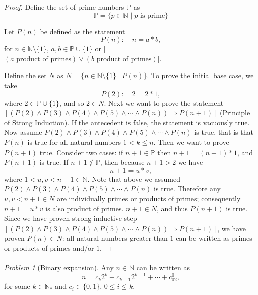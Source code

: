 \documentclass[11pt,twoside, reqno, align]{amsart}
\theoremstyle{remark}
\newtheorem{Prob}{Problem}
\def\N{\mathbb N}
\def\P{\mathbb P}
\newcommand{\OR}{\vee}
\newcommand{\AND}{\wedge}
\renewcommand{\implies}{\Rightarrow}
\begin{document}
\begin{proof}

Define the set of prime numbers $\P$ as
$$
\P = \{p \in \N \mid p \text{ is prime}\}
$$

Let $P(n)$ be defined as the statement
$$
P(n): \quad n = a*b,
$$
for $n \in \N \setminus \{1\}$, $a,b \in \P \cup \{1\}$ or [$(a\text{ product of primes}) \OR (b\text{ product of primes})$]. 

Define the set $N$ as $N = \{ n \in \N \setminus \{1\} \mid P(n)\}$. To prove the initial base case, we take
$$
P(2): \quad 2 = 2*1,
$$
where $2 \in \P \cup \{1\}$, and so $2 \in N$. Next we want to prove the statement $[(P(2) \AND P(3) \AND P(4) \AND P(5) \AND \cdots \AND P(n)) \implies P(n+1)]$ (Principle of Strong Induction). If the antecedent is false, the statement is vacuously true. Now assume $P(2) \AND P(3) \AND P(4) \AND P(5) \AND \cdots \AND P(n)$ is true, that is that $P(n)$ is true for all natural numbers $1 < k \leq n$. Then we want to prove $P(n+1)$ true. Consider two cases: if $n+1 \in \P$ then $n+1 = (n+1)*1$, and $P(n+1)$ is true. If $n+1 \not\in \P$, then because $n+1 > 2$ we have
$$
n+1 = u*v,
$$
where $1 < u,v < n+1 \in \N$. Note that above we assumed $P(2) \AND P(3) \AND P(4) \AND P(5) \AND \cdots \AND P(n)$ is true. Therefore any $u, v < {n+1} \in N$ are individually primes or products of primes; consequently $n+1 = u*v$ is also product of primes. $n+1 \in N$, and thus $P(n+1)$ is true. Since we have proven strong inductive step $[(P(2) \AND P(3) \AND P(4) \AND P(5) \AND \cdots \AND P(n)) \implies P(n+1)]$, we have proven $P(n) \in N$: all natural numbers greater than $1$ can be written as primes or products of primes and/or $1$.
\end{proof}

\paragraph{}

\begin{Prob}[Binary expansion]
Any $n\in \N$ can be written as 
$$
n=c_k2^k+c_{k-1}2^{k-1}+\cdots+c_02^0,
$$
for some $k\in \N_*$ and $c_i\in\{0,1\}$, $0\leq i\leq k$.
\end{Prob}
\end{document}

